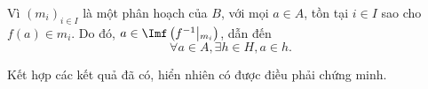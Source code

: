 Vì $(m_i)_{i \in I}$ là một phân hoạch của $B$, với mọi $a \in A$, tồn tại $i \in I$ sao cho $f(a) \in m_i$. Do đó, $a \in \Imf\left(f^{-1}\middle|_{m_i}\right)$, dẫn đến \begin{equation*}
   \forall a \in A, \exists h \in H, a \in h.
\end{equation*}

Kết hợp các kết quả đã có, hiển nhiên có được điều phải chứng minh.
